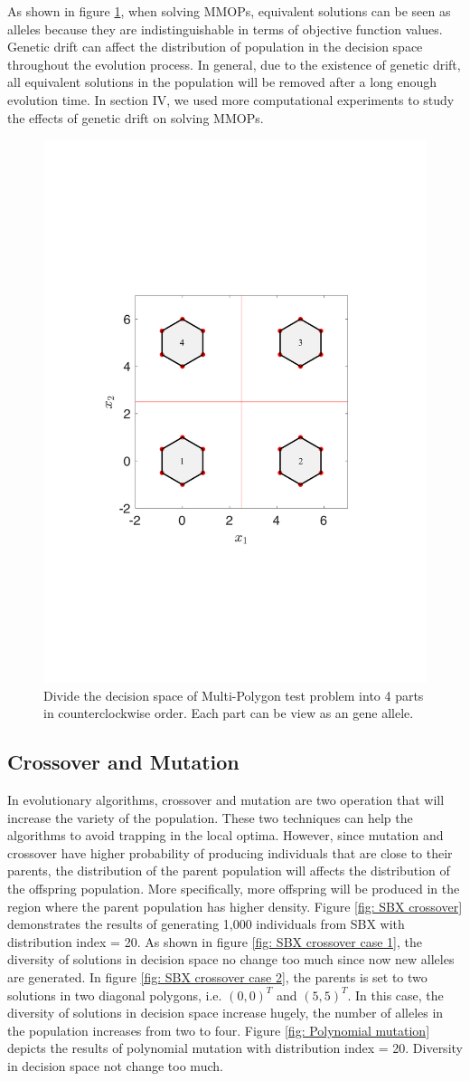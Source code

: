 \documentclass[conference]{IEEEtran}
\begin{document}
As shown in figure \ref{fig: Alleles}, when solving MMOPs, equivalent solutions can be seen as alleles because they are indistinguishable in terms of objective function values. Genetic drift can affect the distribution of population in the decision space throughout the evolution process. In general, due to the existence of genetic drift, all equivalent solutions in the population will be removed after a long enough evolution time. In section IV, we used more computational experiments to study the effects of genetic drift on solving MMOPs.

\begin{figure}[htbp]
    \centering
    \includegraphics[width=.3\textwidth]{Section3/Alleles}
    \caption{Divide the decision space of Multi-Polygon test problem into 4 parts in counterclockwise order. Each part can be view as an gene allele.}
    \label{fig: Alleles}
\end{figure}

\subsection{Crossover and Mutation}
In evolutionary algorithms, crossover and mutation are two operation that will increase the variety of the population. These two techniques can help the algorithms to avoid trapping in the local optima. However, since mutation and crossover have higher probability of producing individuals that are close to their parents, the distribution of the parent population will affects the distribution of the offspring population. More specifically, more offspring will be produced in the region where the parent population has higher density. Figure \ref{fig: SBX crossover} demonstrates the results of generating 1,000 individuals from SBX\cite{SBX} with distribution index = 20. As shown in figure \ref{fig: SBX crossover case 1}, the diversity of solutions in decision space no change too much since now new alleles are generated. In figure \ref{fig: SBX crossover case 2}, the parents is set to two solutions in two diagonal polygons, i.e. $(0, 0)^T$ and $(5, 5)^T$. In this case, the diversity of solutions in decision space increase hugely, the number of alleles in the population increases from two to four. Figure \ref{fig: Polynomial mutation} depicts the results of polynomial mutation with distribution index = 20. Diversity in decision space not change too much. 
\end{document}
